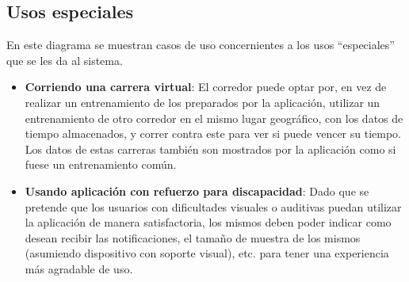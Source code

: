 \subsection{Usos especiales}
En este diagrama se muestran casos de uso concernientes a los usos ``especiales'' que se les da al sistema.

\begin{itemize}
	\item \textbf{Corriendo una carrera virtual}: El corredor puede optar por, en vez de realizar un entrenamiento de los preparados por la aplicación, utilizar un entrenamiento de otro corredor en el mismo lugar geográfico, con los datos de tiempo almacenados, y correr contra este para ver si puede vencer su tiempo. Los datos de estas carreras también son mostrados por la aplicación como si fuese un entrenamiento común.
	\item \textbf{Usando aplicación con refuerzo para discapacidad}: Dado que se pretende que los usuarios con dificultades visuales o auditivas puedan utilizar la aplicación de manera satisfactoria, los mismos deben poder indicar como desean recibir las notificaciones, el tamaño de muestra de los mismos (asumiendo dispositivo con soporte visual), etc. para tener una experiencia más agradable de uso.
\end{itemize}

